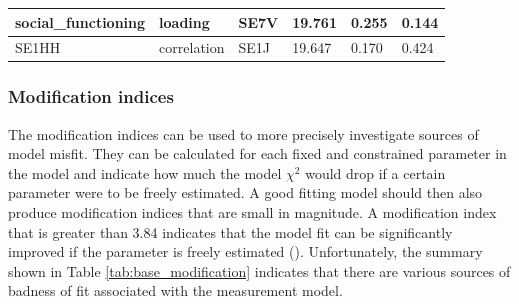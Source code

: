 \documentclass[11pt]{article}
\begin{document}
\begin{table}[h!]
{\begin{tabular}{|l|l|l|l|l|l|}
social\_functioning     & loading            & SE7V                     & 19.761                      &  0.255                                                                       &  0.144 \\ \hline
SE1HH                   & correlation        & SE1J                     & 19.647                      &  0.170                                                                       &  0.424 \\ \hline
\end{tabular}                                                                                                    
}
\end{table}

\subsubsection{Modification indices}

The modification indices can be used to more precisely investigate sources of
model misfit. They can be calculated for each fixed and constrained parameter in
the model and indicate how much the model $\chi^2$ would drop if a certain
parameter were to be freely estimated. A good fitting model should then also
produce modification indices that are small in magnitude. A modification index
that is greater than 3.84 indicates that the model fit can be significantly
improved if the parameter is freely estimated (\cite{brown2015}). Unfortunately,
the summary shown in Table \ref{tab:base_modification} indicates that there are
various sources of badness of fit associated with the measurement model.

\end{document}

